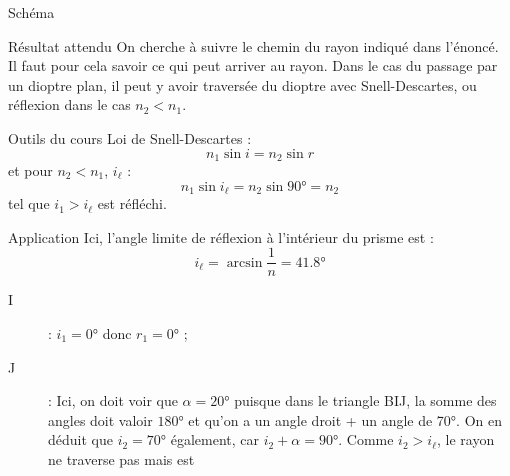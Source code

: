 \documentclass[a4paper, 11pt, oneside]{book}
\begin{document}
{\begin{tcbraster}[raster columns=3, raster equal height=rows]
\begin{NCdefi}[raster multicolumn=2]{Schéma}
\begin{center}
        \end{center}
    \end{NCdefi}
    \begin{tcolorbox}[blankest, raster multicolumn=1, space to=\myspace]
        \begin{tcbraster}[raster columns=1]
            \begin{NCprop}[]{Résultat attendu}
                On cherche à suivre le chemin du rayon indiqué dans l'énoncé. Il
                faut pour cela savoir ce qui peut arriver au rayon. Dans le cas
                du passage par un dioptre plan, il peut y avoir traversée du
                dioptre avec Snell-Descartes, ou réflexion dans le cas $n_2 <
                n_1$.
            \end{NCprop}
            \begin{NCrapp}{Outils du cours}
                Loi de Snell-Descartes :
                \[ n_1\sin i = n_2\sin r\]
                et pour $n_2 < n_1$, $i_\ell$ :
                \[ n_1\sin i_\ell = n_2\sin \ang{90;;} = n_2\]
                tel que $i_1 > i_\ell$ est réfléchi.
            \end{NCrapp}
        \end{tcbraster}
    \end{tcolorbox}
\end{tcbraster}
\begin{NCexem}[sidebyside]{Application}
    Ici, l'angle limite de réflexion à l'intérieur du prisme est : \[i_\ell =
    \arcsin \frac{1}{n} = \boxed{ \ang{41.8;;}}\]
    \begin{description}
        \item[I] : $\boxed{i_1 = \ang{0;;}}$ donc
            $\boxed{r_1 = \ang{0;;}}$ ;
        \item[J] : Ici, on doit voir que $\alpha = \ang{20;;}$ puisque
            dans le triangle BIJ, la somme des angles doit valoir $\ang{180;;}$
            et qu'on a un angle droit + un angle de \ang{70;;}.
            On en déduit que $\boxed{i_2 = \ang{70;;}}$ également, car
            $i_2 + \alpha = \ang{90;;}$.\smallbreak
            Comme \underline{$i_2 > i_\ell$}, le rayon ne traverse pas mais est

\end{description}
\end{NCexem}}
\end{document}
